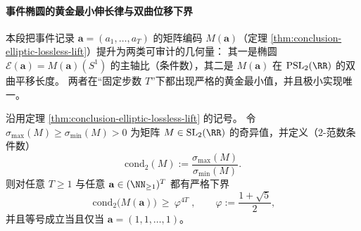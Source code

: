 \paragraph{事件椭圆的黄金最小伸长律与双曲位移下界}
本段把事件记录 \(\mathbf a=(a_1,\dots,a_T)\) 的矩阵编码 \(M(\mathbf a)\)（定理 \ref{thm:conclusion-elliptic-lossless-lift}）提升为两类可审计的几何量：
其一是椭圆 \(\mathcal E(\mathbf a)=M(\mathbf a)(S^1)\) 的主轴比（条件数），其二是 \(M(\mathbf a)\) 在 \(\mathrm{PSL}_2(\RR)\) 的双曲平移长度。
两者在“固定步数 \(T\)”下都出现严格的黄金最小值，并且极小实现唯一。

\begin{theorem}\label{thm:conclusion-event-ellipse-golden-minimal-stretch}
沿用定理 \ref{thm:conclusion-elliptic-lossless-lift} 的记号。
令 \(\sigma_{\max}(M)\ge \sigma_{\min}(M)>0\) 为矩阵 \(M\in \mathrm{SL}_2(\RR)\) 的奇异值，并定义（\(2\)-范数条件数）
\[
\mathrm{cond}_2(M):=\frac{\sigma_{\max}(M)}{\sigma_{\min}(M)}.
\]
则对任意 \(T\ge 1\) 与任意 \(\mathbf a\in(\NN_{\ge 1})^T\) 都有严格下界
\[
\boxed{\;
\mathrm{cond}_2\!\bigl(M(\mathbf a)\bigr)\ \ge\ \varphi^{4T}\;},
\qquad
\varphi:=\frac{1+\sqrt5}{2},
\]
并且等号成立当且仅当 \(\mathbf a=(1,1,\dots,1)\)。
\end{theorem}

